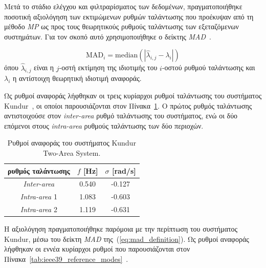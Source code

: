 Μετά το στάδιο ελέγχου και φιλτραρίσματος των δεδομένων, πραγματοποιήθηκε ποσοτική
αξιολόγηση των εκτιμώμενων ρυθμών ταλάντωσης που προέκυψαν από τη μέθοδο \textenglish{\textit{MP}} ως προς
τους θεωρητικούς ρυθμούς ταλάντωσης των εξεταζόμενων συστημάτων. Για τον σκοπό αυτό χρησιμοποιήθηκε
ο δείκτης \textenglish{\textit{MAD}}~\cite{modal2018}.

\begin{equation}
\mathrm{MAD}_i = \mathrm{median}\left(\left| \hat{\lambda}_{i,j} - \lambda_i \right|\right)
\label{eq:mad_definition}
\end{equation}
όπου \(\hat{\lambda}_{i,j}\) είναι η \(j\)-οστή εκτίμηση της ιδιοτιμής του \(i\)-οστού
ρυθμού ταλάντωσης και \(\lambda_i\) η αντίστοιχη θεωρητική ιδιοτιμή αναφοράς.

Ως ρυθμοί αναφοράς λήφθηκαν οι τρεις κυρίαρχοι ρυθμοί ταλάντωσης του
συστήματος Kundur~\cite{estimation2021}, οι οποίοι παρουσιάζονται στον
Πίνακα~\ref{tab:kundur_reference_modes}. Ο πρώτος ρυθμός ταλάντωσης αντιστοιχούσε στον \textenglish{\textit{inter-area}}
ρυθμό ταλάντωσης του συστήματος, ενώ οι δύο επόμενοι στους \textenglish{\textit{intra-area}} ρυθμούς ταλάντωσης των δύο περιοχών.


\begin{table}[!htbp]
\centering
\caption{Ρυθμοί αναφοράς του συστήματος Kundur Two-Area System.}
\label{tab:kundur_reference_modes}
\begin{tabular}{ccc}
\toprule
\textbf{ρυθμός ταλάντωσης} & \textbf{$f$ [Hz]} & \textbf{$\sigma$ [rad/s]} \\
\midrule
\textenglish{\textit{Inter-area}}   & 0.540 & -0.127 \\
\textenglish{\textit{Intra-area}} 1 & 1.083 & -0.603 \\
\textenglish{\textit{Intra-area}} 2 & 1.119 & -0.631 \\
\bottomrule
\end{tabular}
\end{table}
\else
Η αξιολόγηση πραγματοποιήθηκε παρόμοια με την περίπτωση του συστήματος Kundur, μέσω του δείκτη \textenglish{\textit{MAD}} της~(\ref{eq:mad_definition}). Ως ρυθμοί αναφοράς λήφθηκαν οι εννέα κυρίαρχοι ρυθμοί που παρουσιάζονται στον Πίνακα~\ref{tab:ieee39_reference_modes}~\cite{sarkar2024drga}.

